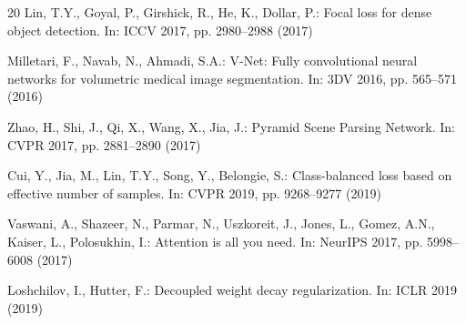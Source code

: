 \documentclass[runningheads]{llncs}
\begin{document}
\begin{thebibliography}{20}
Lin, T.Y., Goyal, P., Girshick, R., He, K., Dollar, P.: Focal loss for dense object detection. In: ICCV 2017, pp. 2980--2988 (2017)

Milletari, F., Navab, N., Ahmadi, S.A.: V-Net: Fully convolutional neural networks for volumetric medical image segmentation. In: 3DV 2016, pp. 565--571 (2016)

Zhao, H., Shi, J., Qi, X., Wang, X., Jia, J.: Pyramid Scene Parsing Network. In: CVPR 2017, pp. 2881--2890 (2017)

Cui, Y., Jia, M., Lin, T.Y., Song, Y., Belongie, S.: Class-balanced loss based on effective number of samples. In: CVPR 2019, pp. 9268--9277 (2019)

Vaswani, A., Shazeer, N., Parmar, N., Uszkoreit, J., Jones, L., Gomez, A.N., Kaiser, L., Polosukhin, I.: Attention is all you need. In: NeurIPS 2017, pp. 5998--6008 (2017)

Loshchilov, I., Hutter, F.: Decoupled weight decay regularization. In: ICLR 2019 (2019)

\end{thebibliography}
\end{document}
